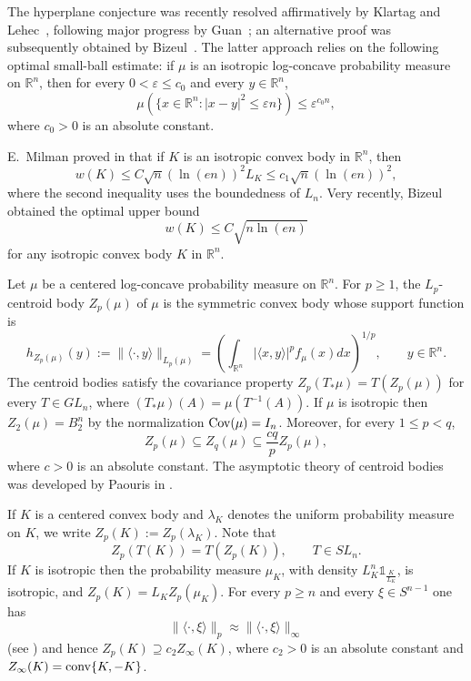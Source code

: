 \documentclass[11pt,leqno]{article}
\theoremstyle{definition}
\numberwithin{equation}{section}
\newcommand{\ls}{\leqslant}
\newcommand{\gr}{\geqslant}
\begin{document}
The hyperplane conjecture was recently resolved affirmatively by
Klartag and Lehec~\cite{KL}, following major progress by Guan~\cite{Guan};
an alternative proof was subsequently obtained by Bizeul~\cite{Bizeul-2025}.
The latter approach relies on the following optimal small-ball estimate:
if $\mu$ is an isotropic log-concave probability measure on $\mathbb{R}^n$,
then for every $0<\varepsilon\ls c_0$ and every $y\in\mathbb{R}^n$,
\begin{equation}\label{eq:optimal-small-ball}
\mu\left(\{x\in\mathbb{R}^n:|x-y|^2\ls\varepsilon n\}\right)
\ls \varepsilon^{c_0 n},
\end{equation}
where $c_0>0$ is an absolute constant.

E.~Milman proved in \cite{EMilman-2014} that if $K$ is an isotropic convex body in ${\mathbb R}^n$, then
$$w(K) \ls C \sqrt{n} (\ln(en))^2 L_K \ls c_1 \sqrt{n} (\ln (en))^2,$$
where the second inequality uses the boundedness of $L_n$. Very recently, Bizeul \cite{Bizeul-M-2026} obtained the optimal upper bound
\begin{equation}\label{eq:Bizeul-M}
w(K) \ls C\sqrt{n\ln(en)}
\end{equation}
for any isotropic convex body $K$ in ${\mathbb R}^n$.

\medskip 

Let $\mu$ be a centered log-concave probability measure on $\mathbb{R}^n$. For $p\gr 1$, the
$L_p$-centroid body $Z_p(\mu)$ of $\mu $ is the symmetric convex body whose support function is
\begin{equation*} h_{Z_p(\mu)}(y):=\|\langle \cdot ,y\rangle\|_{L_p(\mu)}=\left(
\int_{\mathbb{R}^n} |\langle x,y\rangle|^p f_{\mu}(x)dx \right)^{1/p},\qquad y\in \mathbb{R}^n.
\end{equation*} The centroid bodies satisfy the covariance property $Z_p(T_{\ast}\mu)=T(Z_p(\mu ))$ for every $T\in GL_n$,
where $(T_{\ast}\mu)(A)=\mu(T^{-1}(A))$. If $\mu$ is isotropic then $Z_2(\mu)=B_2^n$ by the normalization ${\rm Cov}(\mu)=I_n$. Moreover, for every $1\ls p<q$,
\begin{equation}\label{eq:zq-mu-inclusions}Z_p(\mu)\subseteq Z_q(\mu)\subseteq \frac{cq}{p}Z_p(\mu),
\end{equation}
where $c>0$ is an absolute constant. The asymptotic theory of centroid bodies was developed by Paouris in
\cite{Paouris-GAFA,Paouris-TAMS}.

If $K$ is a centered convex body and $\lambda_K$ denotes the uniform probability measure on $K$, we write
$Z_p(K):=Z_p(\lambda_K)$. Note that
\[Z_p(T(K))=T(Z_p(K)),\qquad T\in SL_n.\]
If $K$ is isotropic then the probability measure $\mu_K$, with density $L_K^n\mathds{1}_{\frac{K}{L_K}}$, is 
isotropic, and $Z_p(K)=L_KZ_p(\mu_K)$. For every $p\gr n$ and every $\xi\in S^{n-1}$ one has 
\begin{equation}\label{eq:stable}\|\langle \cdot,\xi\rangle\|_p\approx \|\langle \cdot,\xi\rangle\|_{\infty}\end{equation} 
(see \cite[Lemma~3.2.8/Proposition~5.1.2]{BGVV-book}) and hence $Z_p(K)\supseteq c_2Z_{\infty }(K)$, where $c_2>0$ is an absolute constant and 
$Z_{\infty}(K)={\rm conv}\{K,-K\}$. 
\end{document}
